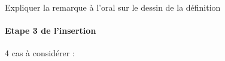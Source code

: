 \begin{com}
	Expliquer la remarque à l'oral sur le dessin de la définition
\end{com}

\paragraph{Etape 3 de l'insertion}
4 cas à considérer :
%		
%		
%
%		
%		
%

